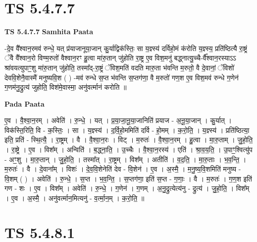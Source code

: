 \documentclass[17pt]{extarticle}
\begin{document}

\section{ TS 5.4.7.7 }

\textbf{TS 5.4.7.7 } \newline
\textbf{Samhita Paata} \newline

-दे॒व वै᳚श्वान॒रमव॑ रुन्धे॒ यत् प्र॑याजानूया॒जान् कु॒र्याद्विक॑स्तिः॒ सा य॒ज्ञ्स्य॑ दर्विहो॒मं क॑रोति य॒ज्ञ्स्य॒ प्रति॑ष्ठित्यै रा॒ष्ट्रं ॅवै वै᳚श्वान॒रो विण्म॒रुतो॑ वैश्वान॒रꣳ हु॒त्वा मा॑रु॒तान् जु॑होति रा॒ष्ट्र ए॒व विश॒मनु॑ बद्ध्नात्यु॒च्चै-र्वै᳚श्वान॒रस्याऽऽ श्रा॑वयत्युपाꣳ॒॒शु मा॑रु॒तान् जु॑होति॒ तस्मा᳚द्-रा॒ष्ट्रं ॅविश॒मति॑ वदति मारु॒ता भ॑वन्ति म॒रुतो॒ वै दे॒वानां॒ ॅविशो॑ देववि॒शेनै॒वास्मै॑ मनुष्यवि॒श ( ) -मव॑ रुन्धे स॒प्त भ॑वन्ति स॒प्तग॑णा॒ वै म॒रुतो॑ गण॒श ए॒व विश॒मव॑ रुन्धे ग॒णेन॑ ग॒णम॑नु॒द्रुत्य॑ जुहोति॒ विश॑मे॒वास्मा॒ अनु॑वर्त्मानं करोति ॥ \newline

\textbf{Pada Paata} \newline

ए॒व । वै॒श्वा॒न॒रम् । अवेति॑ । रु॒न्धे॒ । यत् । प्र॒या॒जा॒नू॒या॒जानिति॑ प्रयाज - अ॒नू॒या॒जान् । कु॒र्यात् । विक॑स्ति॒रिति॒ वि - क॒स्तिः॒ । सा । य॒ज्ञ्स्य॑ । द॒र्वि॒हो॒ममिति॑ दर्वि - हो॒मम् । क॒रो॒ति॒ । य॒ज्ञ्स्य॑ । प्रति॑ष्ठित्या॒ इति॒ प्रति॑ - स्थि॒त्यै॒ । रा॒ष्ट्रम् । वै । वै॒श्वा॒न॒रः । विट् । म॒रुतः॑ । वै॒श्वा॒न॒रम् । हु॒त्वा । मा॒रु॒ताम् । जु॒हो॒ति॒ । रा॒ष्ट्रे । ए॒व । विश᳚म् । अन्विति॑ । ब॒द्ध्ना॒ति॒ । उ॒च्चैः । वै॒श्वा॒न॒रस्य॑ । एति॑ । श्रा॒व॒य॒ति॒ । उ॒पाꣳ॒॒श्वित्यु॑प - अꣳ॒॒शु । मा॒रु॒तान् । जु॒हो॒ति॒ । तस्मा᳚त् । रा॒ष्ट्रम् । विश᳚म् । अतीति॑ । व॒द॒ति॒ । मा॒रु॒ताः । भ॒व॒न्ति॒ । म॒रुतः॑ । वै । दे॒वाना᳚म् । विशः॑ । दे॒व॒वि॒शेनेति॑ देव - वि॒शेन॑ । ए॒व । अ॒स्मै॒ । म॒नु॒ष्य॒वि॒शमिति॑ मनुष्य - वि॒शम् ( ) । अवेति॑ । रु॒न्धे॒ । स॒प्त । भ॒व॒न्ति॒ । स॒प्तग॑णा॒ इति॑ स॒प्त - ग॒णाः॒ । वै । म॒रुतः॑ । ग॒ण॒श इति॑ गण - शः । ए॒व । विश᳚म् । अवेति॑ । रु॒न्धे॒ । ग॒णेन॑ । ग॒णम् । अ॒नु॒द्रुत्येत्य॑नु - द्रुत्य॑ । जु॒हो॒ति॒ । विश᳚म् । ए॒व । अ॒स्मै॒ । अनु॑वर्त्मान॒मित्यनु॑ - व॒र्त्मा॒न॒म् । क॒रो॒ति॒ ॥  \newline





\section{ TS 5.4.8.1 }
\end{document}
